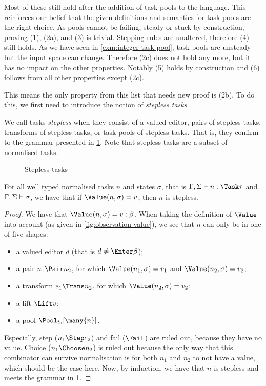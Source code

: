 Most of these still hold after the addition of task pools to the language.
This reinforces our belief that the given definitions and semantics for task pools are the right choice.
As pools cannot be failing, steady or stuck by construction,
proving (1), (2a), and (3) is trivial.
Stepping rules are unaltered, therefore (4) still holds.
As we have seen in \cref{exm:integer-task-pool},
task pools are unsteady but the input space can change.
Therefore (2c) does not hold any more,
but it has no impact on the other properties.
Notably (5) holds by construction and (6) follows from all other properties except (2c).

This means the only property from this list that needs new proof is (2b).
To do this, we first need to introduce the notion of \emph{stepless tasks}.

\begin{definition}
  \label{def:stepless-task}
  We call tasks \emph{stepless} when they consist of
  a valued editor,
  pairs of stepless tasks,
  transforms of stepless tasks,
  or task pools of stepless tasks.
  That is, they confirm to the grammar presented in \cref{fig:stepless-tasks-grammar}.
  Note that stepless tasks are a subset of normalised tasks.
\end{definition}

\begin{figure}
  \label{fig:stepless-tasks-grammar}
  \caption{Stepless tasks}
\end{figure}

\begin{proposition}
  \label{prp:valued-means-stepless}
  For all well typed normalised tasks $n$ and states $\sigma$,
  that is $\Gamma,\Sigma \infers n:\Task\tau$ and $\Gamma,\Sigma \vdash \sigma$,
  we have that
    if $\Value(n,\sigma) = v$,
    then $n$ is stepless.
\end{proposition}
\begin{proof}
  We have that $\Value(n,\sigma) = v : \beta$.
  When taking the definition of $\Value$ into account (as given in \cref{fig:observation-value}),
  we see that $n$ can only be in one of five shapes:
  \begin{itemize}
    \item a valued editor $d$ (that is $d \neq \Enter\beta$);
    \item a pair $n_1 \Pair n_2$, for which $\Value(n_1,\sigma) = v_1$ and $\Value(n_2,\sigma) = v_2$;
    \item a transform $e_1 \Trans n_2$, for which $\Value(n_2,\sigma) = v_2$;
    \item a lift $\Lift v$;
    \item a pool $\Pool_{t_0} [\many{n}]$.
  \end{itemize}
  Especially, step ($n_1 \Step e_2$) and fail ($\Fail$) are ruled out, because they have no value.
  Choice ($n_1 \Choose n_2$) is ruled out
  because the only way that this combinator can survive normalisation is for both $n_1$ and $n_2$ to not have a value,
  which should be the case here.
  Now, by induction, we have that $n$ is stepless and meets the grammar in \cref{fig:stepless-tasks-grammar}.
\end{proof}

